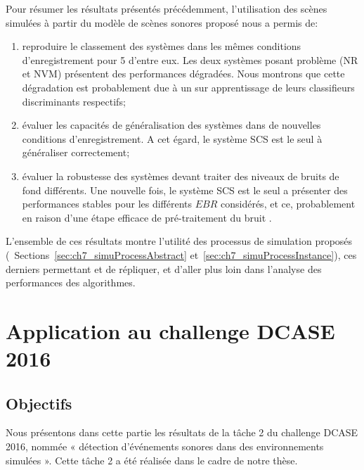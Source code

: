 Pour résumer les résultats présentés précédemment, l'utilisation des scènes simulées à partir du modèle de scènes sonores proposé nous a permis de:

\begin{enumerate}
\item reproduire le classement des systèmes dans les mêmes conditions d'enregistrement pour 5 d'entre eux. Les deux systèmes posant problème (NR et NVM) présentent des performances dégradées. Nous montrons que cette dégradation est probablement due à un sur apprentissage de leurs classifieurs discriminants respectifs;
\item évaluer les capacités de généralisation des systèmes dans de nouvelles conditions d'enregistrement. A cet égard, le système SCS est le seul à généraliser correctement;
\item évaluer la robustesse des systèmes devant traiter des niveaux de bruits de fond différents. Une nouvelle fois, le système SCS est le seul a présenter des performances stables pour les différents $EBR$ considérés, et ce, probablement en raison d'une étape efficace de pré-traitement du bruit .
\end{enumerate}

L'ensemble de ces résultats montre l'utilité des processus de simulation proposés (\cf~Sections~\ref{sec:ch7_simuProcessAbstract} et~\ref{sec:ch7_simuProcessInstance}), ces derniers permettant et de répliquer, et d'aller plus loin dans l'analyse des performances des algorithmes.


\section{Application au challenge DCASE  2016}
\label{sec:ch5_appDcase2016}

\subsection{Objectifs}

Nous présentons dans cette partie les résultats de la tâche 2 du challenge DCASE 2016, nommée « détection d'événements sonores dans des environnements simulées ». Cette tâche 2 a été réalisée dans le cadre de notre thèse. 

